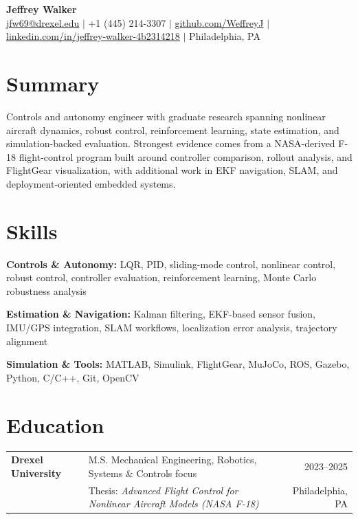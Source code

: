 \documentclass[10pt,letterpaper]{article}
\begin{document}
\begin{center}
    {\LARGE \textbf{Jeffrey Walker}}\\[0.28em]
    \href{mailto:jfw69@drexel.edu}{jfw69@drexel.edu}
    \quad $|$ \quad
    +1 (445) 214-3307
    \quad $|$ \quad
    \href{https://github.com/WeffreyJ}{github.com/WeffreyJ}
    \quad $|$ \quad
    \href{https://www.linkedin.com/in/jeffrey-walker-4b2314218/}{linkedin.com/in/jeffrey-walker-4b2314218}
    \quad $|$ \quad
    Philadelphia, PA
\end{center}

\section*{Summary}

Controls and autonomy engineer with graduate research spanning nonlinear aircraft dynamics, robust control, reinforcement learning, state estimation, and simulation-backed evaluation. Strongest evidence comes from a NASA-derived F-18 flight-control program built around controller comparison, rollout analysis, and FlightGear visualization, with additional work in EKF navigation, SLAM, and deployment-oriented embedded systems.

\section{Skills}

\textbf{Controls \& Autonomy:} LQR, PID, sliding-mode control, nonlinear control, robust control, controller evaluation, reinforcement learning, Monte Carlo robustness analysis

\textbf{Estimation \& Navigation:} Kalman filtering, EKF-based sensor fusion, IMU/GPS integration, SLAM workflows, localization error analysis, trajectory alignment

\textbf{Simulation \& Tools:} MATLAB, Simulink, FlightGear, MuJoCo, ROS, Gazebo, Python, C/C++, Git, OpenCV

\section{Education}

\begin{tabularx}{\textwidth}{@{}l Y r@{}}
\textbf{Drexel University} & M.S. Mechanical Engineering, Robotics, Systems \& Controls focus & 2023--2025 \\
& Thesis: \textit{Advanced Flight Control for Nonlinear Aircraft Models (NASA F-18)} & Philadelphia, PA
\end{tabularx}
\end{document}
